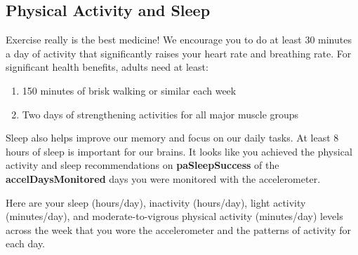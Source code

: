 
\subsection{Physical Activity and Sleep}

Exercise really is the best medicine! We encourage you to do at least 30 minutes
a day of activity that significantly raises your heart rate and breathing rate.
For significant health benefits, adults need at least:

  \begin{enumerate}
    \item 150 minutes of brisk walking or similar each week
    \item Two days of strengthening activities for all major muscle groups
  \end{enumerate}    

Sleep also helps improve our memory and focus on our daily tasks. At least 8
hours of sleep is important for our brains. It looks like you achieved the
physical activity and sleep recommendations on \textbf{{paSleepSuccess}} of the
\textbf{{accelDaysMonitored}} days you were monitored with the accelerometer.

Here are your sleep (hours/day), inactivity (hours/day), light activity
(minutes/day), and moderate-to-vigrous physical activity (minutes/day) levels
across the week that you wore the accelerometer and the patterns of activity for
each day.

\vspace{10mm}


